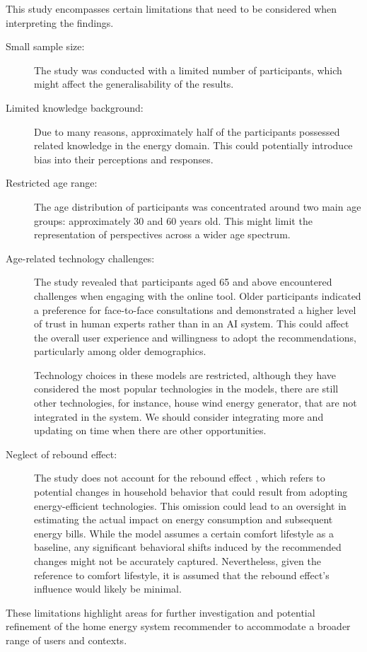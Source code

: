 This study encompasses certain limitations that need to be considered when interpreting the findings.
\begin{description}
    \item[Small sample size:] The study was conducted with a limited number of participants, which might affect the generalisability of the results.
    \item[Limited knowledge background:] Due to many reasons, approximately half of the participants possessed related knowledge in the energy domain. This could potentially introduce bias into their perceptions and responses.
    \item[Restricted age range:] The age distribution of participants was concentrated around two main age groups: approximately 30 and 60 years old. This might limit the representation of perspectives across a wider age spectrum.
    \item[Age-related technology challenges:] The study revealed that participants aged 65 and above encountered challenges when engaging with the online tool. Older participants indicated a preference for face-to-face consultations and demonstrated a higher level of trust in human experts rather than in an AI system. This could affect the overall user experience and willingness to adopt the recommendations, particularly among older demographics.
    \item[] Technology choices in these models are restricted, although they have considered the most popular technologies in the models, there are still other technologies, for instance, house wind energy generator, that are not integrated in the system. We should consider integrating more and updating on time when there are other opportunities. 
    \item[Neglect of rebound effect:] The study does not account for the rebound effect \cite{Herring2007}, which refers to potential changes in household behavior that could result from adopting energy-efficient technologies. This omission could lead to an oversight in estimating the actual impact on energy consumption and subsequent energy bills. While the model assumes a certain comfort lifestyle as a baseline, any significant behavioral shifts induced by the recommended changes might not be accurately captured. Nevertheless, given the reference to comfort lifestyle, it is assumed that the rebound effect's influence would likely be minimal.
\end{description}
These limitations highlight areas for further investigation and potential refinement of the home energy system recommender to accommodate a broader range of users and contexts.